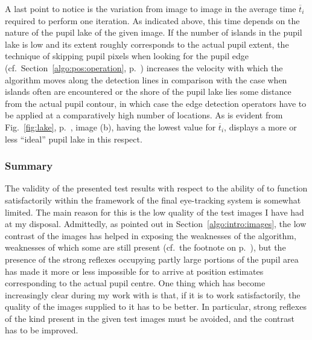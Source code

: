 A last point to notice is the variation from image to image in the
average time $\overline{t}_{i}$ required to perform one iteration.  As
indicated above, this time depends on the nature of the pupil lake of
the given image.  If the number of islands in the pupil lake is low
and its extent roughly corresponds to the actual pupil extent, the
technique of skipping pupil pixels when looking for the pupil edge
(cf.\ Section~\ref{algo:pos:operation},
p.~\pageref{pg:skiplakepixels}) increases the velocity with which the
algorithm moves along the detection lines in comparison with the case
when islands often are encountered or the shore of the pupil lake lies
some distance from the actual pupil contour, in which case the edge
detection operators have to be applied at a comparatively high number
of locations.  As is evident from Fig.~\ref{fig:lake},
p.~\pageref{fig:lake}, image (b), having the lowest value for
$\overline{t}_{i}$, displays a more or less ``ideal'' pupil lake in
this respect.

\subsubsection{Summary}

The validity of the presented test results with respect to the ability
of {\octopus} to function satisfactorily within the framework of the
final eye-tracking system is somewhat limited.  The main reason for
this is the low quality of the test images I have had at my disposal.
Admittedly, as pointed out in Section~\ref{algo:intro:images}, the low
contrast of the images has helped in exposing the weaknesses of the
algorithm, weaknesses of which some are still present (cf.\ the
footnote on p.~\pageref{pg:TEproblems}), but the presence of the
strong reflexes occupying partly large portions of the pupil area has
made it more or less impossible for {\octopus} to arrive at position
estimates corresponding to the actual pupil centre.  One thing which
has become increasingly clear during my work with {\octopus} is that,
if it is to work satisfactorily, the quality of the images supplied to
it has to be better.  In particular, strong reflexes of the kind
present in the given test images must be avoided, and the contrast has
to be improved.

